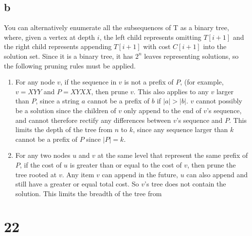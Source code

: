 \documentclass[letterpaper,notitlepage,twoside]{article}
\begin{document}
\subsection*{b}
You can alternatively enumerate all the subsequences of T as a binary tree, where, given a vertex at depth $i$, the left child represents omitting $T[i + 1]$ and the right child represents appending $T[i + 1]$ with cost $C[i + 1]$ into the solution set. Since it is a binary tree, it has $2^n$ leaves representing solutions, so the following pruning rules must be applied.
\begin{enumerate}
\item For any node $v$, if the sequence in $v$ is not a prefix of $P$, (for example, $v = XYY$ and $P = XYXX$, then prune $v$. This also applies to any $v$ larger than $P$, since a string $a$ cannot be a prefix of $b$ if $|a| > |b|$. $v$ cannot possibly be a solution since the children of $v$ only append to the end of $v$'s sequence, and cannot therefore rectify any differences between $v$'s sequence and $P$. This limits the depth of the tree from $n$ to $k$, since any sequence larger than $k$ cannot be a prefix of $P$ since $|P| = k$.
\item For any two nodes $u$ and $v$ at the same level that represent the same prefix of $P$, if the cost of $u$ is greater than or equal to the cost of $v$, then prune the tree rooted at $v$. Any item $v$ can append in the future, $u$ can also append and still have a greater or equal total cost. So $v$'s tree does not contain the solution. This limits the breadth of the tree from 
\end{enumerate}

\section*{22}
\end{document}
